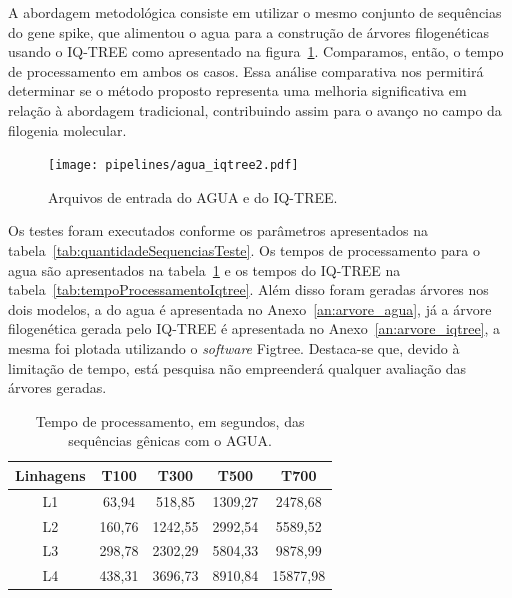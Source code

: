 A abordagem metodológica consiste em utilizar o mesmo conjunto de sequências do gene spike, que alimentou o \gls{agua} para a construção de árvores filogenéticas usando o IQ-TREE como apresentado na figura~\ref{fig:inputAguaIqtree}. Comparamos, então, o tempo de processamento em ambos os casos. Essa análise comparativa nos permitirá determinar se o método proposto representa uma melhoria significativa em relação à abordagem tradicional, contribuindo assim para o avanço no campo da filogenia molecular.
\begin{figure}[htb]
  \centering
  \caption{Arquivos de entrada do AGUA e do IQ-TREE.}
  \texttt{[image: pipelines/agua\_iqtree2.pdf]}
  ~\label{fig:inputAguaIqtree}
\end{figure}

Os testes foram executados conforme os parâmetros apresentados na tabela~\ref{tab:quantidadeSequenciasTeste}. Os tempos de processamento para o \gls{agua} são apresentados na tabela~\ref{tab:tempoProcessamentoAgua} e os tempos do IQ-TREE na tabela~\ref{tab:tempoProcessamentoIqtree}. Além disso foram geradas árvores nos dois modelos, a do \gls{agua} é apresentada no Anexo~\ref{an:arvore_agua}, já a árvore filogenética gerada pelo IQ-TREE é apresentada no Anexo~\ref{an:arvore_iqtree}, a mesma foi plotada utilizando o \textit{software} Figtree. Destaca-se que, devido à limitação de tempo, está pesquisa não empreenderá qualquer avaliação das árvores geradas.

\begin{table}[htb]
  \caption{Tempo de processamento, em segundos, das sequências gênicas com o AGUA.}
  \begin{center}
    \begin{tabular}{c|c|c|c|c}
      \hline
      Linhagens & T100   & T300    & T500    & T700     \\
      \hline
      L1        & 63,94  & 518,85  & 1309,27 & 2478,68  \\
      L2        & 160,76 & 1242,55 & 2992,54 & 5589,52  \\
      L3        & 298,78 & 2302,29 & 5804,33 & 9878,99  \\
      L4        & 438,31 & 3696,73 & 8910,84 & 15877,98 \\
      \hline
    \end{tabular}
  \end{center}
  \label{tab:tempoProcessamentoAgua}
\end{table}

